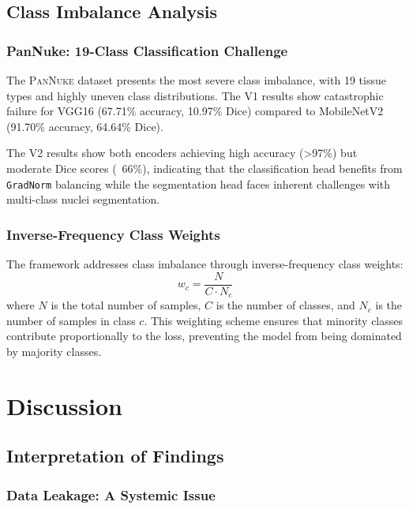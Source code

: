 \documentclass[11pt,a4paper,twoside]{report}
\newcommand{\dataset}[1]{\textsc{#1}}
\newcommand{\model}[1]{\texttt{#1}}
\begin{document}
\section{Class Imbalance Analysis}

\subsection{PanNuke: 19-Class Classification Challenge}

The \dataset{PanNuke} dataset presents the most severe class imbalance, with 19 tissue types and highly uneven class distributions. The V1 results show catastrophic failure for VGG16 (67.71\% accuracy, 10.97\% Dice) compared to MobileNetV2 (91.70\% accuracy, 64.64\% Dice).

The V2 results show both encoders achieving high accuracy (>97\%) but moderate Dice scores (~66\%), indicating that the classification head benefits from \model{GradNorm} balancing while the segmentation head faces inherent challenges with multi-class nuclei segmentation.

\subsection{Inverse-Frequency Class Weights}

The framework addresses class imbalance through inverse-frequency class weights:
\begin{equation}
w_c = \frac{N}{C \cdot N_c}
\end{equation}
where $N$ is the total number of samples, $C$ is the number of classes, and $N_c$ is the number of samples in class $c$. This weighting scheme ensures that minority classes contribute proportionally to the loss, preventing the model from being dominated by majority classes.

\chapter{Discussion}\label{chap:discussion}

\section{Interpretation of Findings}

\subsection{Data Leakage: A Systemic Issue}
\end{document}
